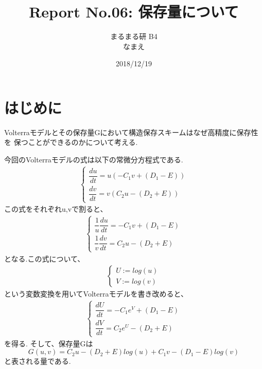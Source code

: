 \documentclass[12pt]{ltjsarticle}
\begin{document}
\begin{titlepage}
\title{Report No.06: 保存量について}
\author{まるまる研 B4 \\ なまえ}
\date{2018/12/19}
\maketitle
\tableofcontents

\end{titlepage}

\section{はじめに}
Volterraモデルとその保存量Gにおいて構造保存スキームはなぜ高精度に保存性を
保つことができるのかについて考える. 

今回のVolterraモデルの式は以下の常微分方程式である.
\begin{eqnarray}
    \left\{
      \begin{array}{l}
         \dfrac{du}{dt} = u(-C_1 v + (D_1 - E)) \\
         \dfrac{dv}{dt} = v(C_2 u - (D_2 + E))
          \label{volterra}
      \end{array}
    \right.
\end{eqnarray}
この式をそれぞれu,vで割ると、
\begin{eqnarray}
    \left\{
      \begin{array}{l}
         \dfrac{1}{u}\dfrac{du}{dt} = -C_1 v + (D_1 - E) \\
         \dfrac{1}{v}\dfrac{dv}{dt} = C_2 u - (D_2 + E) 
  \label{volterra2}
\end{array}
\right.
\end{eqnarray}
となる.この式について、
\begin{eqnarray}
    \left\{
      \begin{array}{l}
         U := log(u) \\
         V := log(v)
  \label{change}
\end{array}
\right.
\end{eqnarray}
という変数変換を用いてVolterraモデルを書き改めると、
\begin{eqnarray}
    \left\{
      \begin{array}{l}
  \dfrac{dU}{dt} = -C_1 e^V + (D_1 - E) \\
  \dfrac{dV}{dt} = C_2 e^U - (D_2 + E)
  \label{Volterra}
\end{array}
\right.
\end{eqnarray}
を得る. そして、保存量Gは
\begin{equation}
  G(u,v) = C_2 u - (D_2 + E)log(u) + C_1 v - (D_1 - E)log(v)
  \label{G(u,v)}
\end{equation}
と表される量である.
\end{document}
